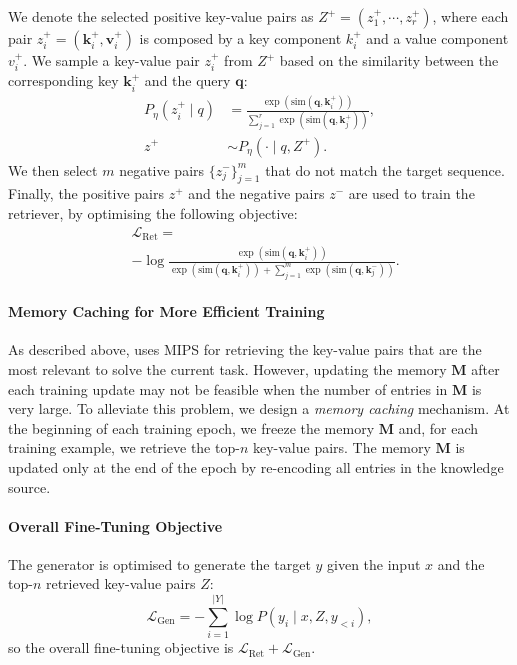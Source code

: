 We denote the selected positive key-value pairs as $Z^+ = (z_1^+, \cdots, z_r^+)$, where each pair $z_{i}^{+} = (\mathbf{k}_{i}^{+}, \mathbf{v}_{i}^{+})$ is composed by a key component $k_{i}^{+}$ and a value component $v_{i}^{+}$.
We sample a key-value pair $z_{i}^+$ from $Z^+$ based on the similarity between the corresponding key $\mathbf{k}_{i}^{+}$ and the query $\mathbf{q}$:
\begin{equation*}
\begin{aligned}
P_{\eta}(z_i^+ \mid q) & = \frac{\exp ( \text{sim}(\mathbf{q}, \mathbf{k}_i^+  ))} {\sum_{j=1}^r \exp ( \text{sim}( \mathbf{q}, \mathbf{k}_j^+ ) ) }, \\
z^+ & \sim P_\eta (\cdot \mid q, Z^+).
\end{aligned}
\end{equation*}
We then select $m$ negative pairs $\{z^-_j\}_{j=1}^m$ that do not match the target sequence.
Finally, the positive pairs $z^+$ and the negative pairs $z^-$ are used to train the retriever, by optimising the following objective:
\begin{equation*}
\begin{aligned}
&\mathcal{L}_{\text{Ret}} =
\\
&-\log \frac{\exp (\text{sim}(\mathbf{q}, \mathbf{k}_i^+  )  )}{ \exp ( \text{sim}(\mathbf{q}, \mathbf{k}_i^+  ) ) + \sum_{j=1}^{m} \exp( \text{sim}(\mathbf{q}, \mathbf{k}_j^-  ) ) }.
\end{aligned}
\end{equation*}


\paragraph{Memory Caching for More Efficient Training}
As described above, \ModelName uses MIPS for retrieving the key-value pairs that are the most relevant to solve the current task.
However, updating the memory $\mathbf{M}$ after each training update may not be feasible when the number of entries in $\mathbf{M}$ is very large.
To alleviate this problem, we design a \emph{memory caching} mechanism. At the beginning of each training epoch, we freeze the memory $\mathbf{M}$ and, for each training example, we retrieve the top-$n$ key-value pairs.
The memory $\mathbf{M}$ is updated only at the end of the epoch by re-encoding all entries in the knowledge source.




\paragraph{Overall Fine-Tuning Objective}
The generator is optimised to generate the target $y$ given the input $x$ and the top-$n$ retrieved key-value pairs $Z$:
\begin{equation*}
\mathcal{L}_{\text{Gen}} = -\sum_{i=1}^{|Y|}  \log P(y_i \mid x, Z, y_{<i}),
\end{equation*}
so the overall fine-tuning objective is $\mathcal{L}_{\text{Ret}} + \mathcal{L}_{\text{Gen}}$.

